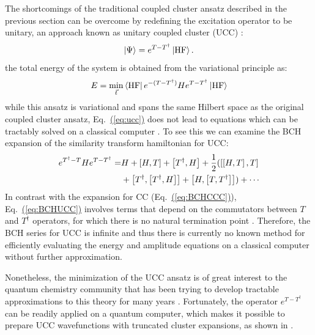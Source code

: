 \documentclass[superscriptaddress,aps,pra,twocolumn,nofootinbib,babel]{revtex4-1}
\newcommand{\eq}[1]{Eq.~\hyperref[eq:#1]{(\ref*{eq:#1})}}
\def\bra#1{\mathinner{\langle{#1}|}}
\def\ket#1{\mathinner{|{#1}\rangle}}
\begin{document}
The shortcomings of the traditional coupled cluster ansatz described in the previous section can be overcome by redefining the excitation operator to be unitary, an approach known as unitary coupled cluster (UCC) \cite{Kutzelnigg.1977.Chapter,Hoffmann.JCP.88.993.1988,Bartlett.CPL.155.133.1989}:
\begin{equation}
\label{eq:ucc}
\ket{\Psi} = e^{T - T^{\dagger}} \ket{\textrm{HF}}.
\end{equation}
the total energy of the system is obtained from the variational principle as:
\begin{align}
\label{eq:UCCenergy}
E=\min_{\vec{t}}  \bra{\textrm{HF}} e^{-(T-T^{\dagger})} H e^{T-T^{\dagger}} \ket{\textrm{HF}}
\end{align}
while this ansatz is variational and spans the same Hilbert space as the original coupled cluster ansatz, \eq{ucc} does not lead to equations which can be tractably solved on a classical computer \cite{kutzelnigg.TCA.80.349.1991,taube.IJQC.106.3393.2006}. To see this we can examine the BCH expansion of the similarity transform hamiltonian for UCC:
\begin{align}\label{eq:BCHUCC}
 e^{T^{\dagger}-T} H  e^{T - T^{\dagger}} = & H + \left[H, T\right] + \left[T^{\dagger},H \right] + \frac{1}{2}(\left[\left[H, T\right], T\right] \notag \\
& + \left[T^{\dagger}, \left[T^{\dagger}, H\right]\right] + \left[H, \left[T, T^{\dagger}\right] \right]) + \cdots
\end{align}
In contrast with the expansion for CC (\eq{BCHCCC}), \eq{BCHUCC} involves terms that depend on the commutators between $T$ and $T^{\dagger}$ operators, for which there is no natural termination point \cite{kutzelnigg.TCA.80.349.1991,taube.IJQC.106.3393.2006}. Therefore, the BCH series for UCC is infinite and thus there is currently no known method for efficiently evaluating the energy and amplitude equations on a classical computer without further approximation.

Nonetheless, the minimization of the UCC ansatz is of great interest to the quantum chemistry community that has been trying to develop tractable approximations to this theory for many years \cite{Kutzelnigg.1977.Chapter,Hoffmann.JCP.88.993.1988,Bartlett.CPL.155.133.1989,Cooper.JCP.133.234102.2010,Evangelista.JCP.134.224102.2011}. Fortunately, the operator $e^{T - T^{\dagger}}$ can be readily applied on a quantum computer, which makes it possible to prepare UCC wavefunctions with truncated cluster expansions, as shown in \cite{Yung.SR.4.3589.2014,Peruzzo.NC.5.4213.2014,Mcclean.NJP.18.023023.2016}.
\end{document}
